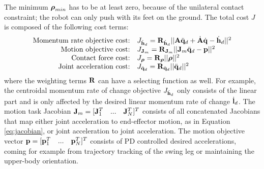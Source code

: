 The minimum $\boldsymbol{\rho}_{min}$ has to be at least zero, because of the unilateral contact constraint; the robot can only push with its feet on the ground. The total cost $J$ is composed of the following cost terms:
\begin{equation*}
\begin{array}{rlcl}
$Momentum rate objective cost:$ & J_{\dot{\vect{h}}_d}= \wght_{\dot{\vect{h}}_d}||\matr{A}\ddqjntd + \dot{\matr{A}}\dqjnt - \dot{\vect{h}}_d||^2\\
$Motion objective cost:$ & J_{\matr{J}_m} = \wght_{\matr{J}_m}||\matr{J}_m\ddqjntd-\vect{p}||^2\\
$Contact force cost:$ & J_{\bs{\rho}}=\wght_{\bs{\rho}}||\bs{\rho}||^2 \\
$Joint acceleration cost:$ & J_{\ddqjntd} = \wght_{\ddqjntd}||\ddqjntd ||^2 \\
\end{array}
\end{equation*}
where the weighting terms $\mathbf{R}$ can have a selecting function as well. For example, the centroidal momentum rate of change objective $J_{\dot{\mathbf{h}}_d}$ only consists of the linear part and is only affected by the desired linear momentum rate of change $\dot{\mathbf{l}}_d$. The motion task Jacobian $\mathbf{J}_m = [\mathbf{J}_1^T\quad...\quad\mathbf{J}_N^T]^T$ consists of all concatenated Jacobians that map either joint acceleration to end-effector motion, as in Equation \eqref{eq:jacobian}, or joint acceleration to joint acceleration. The motion objective vector $\mathbf{p} = [\mathbf{p}_1^T\quad...\quad\mathbf{p}_N^T]^T$  consists of PD controlled desired accelerations, coming for example from trajectory tracking of the swing leg or maintaining the upper-body orientation. %

